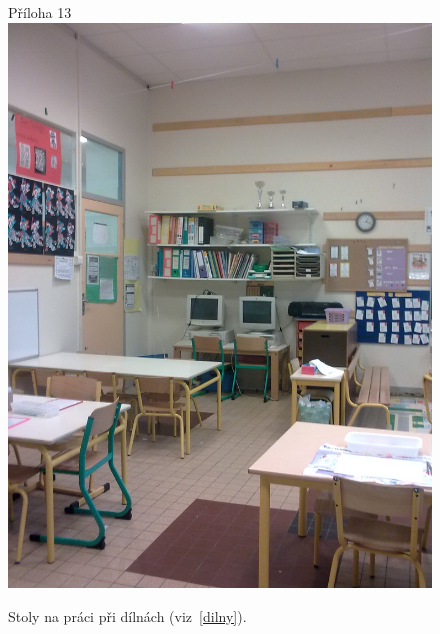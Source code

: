 	\begin{figure}[tb]
		\centering
		Příloha 13\\
		\includegraphics[height=0.35\textheight]{./fotky/Obr13.jpg}
		\caption{
			Stoly na práci při dílnách (viz~\ref{dilny}).
		}
		\label{Obr13}
	\end{figure}
